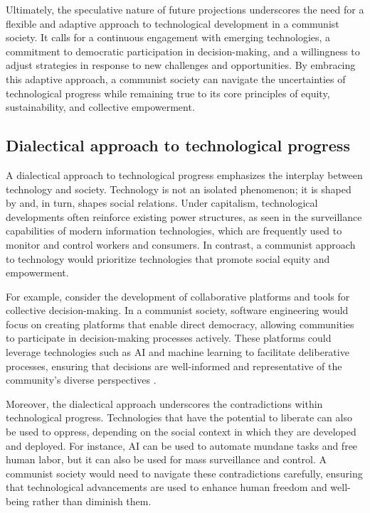 Ultimately, the speculative nature of future projections underscores the need for a flexible and adaptive approach to technological development in a communist society. It calls for a continuous engagement with emerging technologies, a commitment to democratic participation in decision-making, and a willingness to adjust strategies in response to new challenges and opportunities. By embracing this adaptive approach, a communist society can navigate the uncertainties of technological progress while remaining true to its core principles of equity, sustainability, and collective empowerment.

\subsection{Dialectical approach to technological progress}

A dialectical approach to technological progress emphasizes the interplay between technology and society. Technology is not an isolated phenomenon; it is shaped by and, in turn, shapes social relations. Under capitalism, technological developments often reinforce existing power structures, as seen in the surveillance capabilities of modern information technologies, which are frequently used to monitor and control workers and consumers. In contrast, a communist approach to technology would prioritize technologies that promote social equity and empowerment.

For example, consider the development of collaborative platforms and tools for collective decision-making. In a communist society, software engineering would focus on creating platforms that enable direct democracy, allowing communities to participate in decision-making processes actively. These platforms could leverage technologies such as AI and machine learning to facilitate deliberative processes, ensuring that decisions are well-informed and representative of the community's diverse perspectives \cite[pp.~233-237]{ParticipatoryTech2024}.

Moreover, the dialectical approach underscores the contradictions within technological progress. Technologies that have the potential to liberate can also be used to oppress, depending on the social context in which they are developed and deployed. For instance, AI can be used to automate mundane tasks and free human labor, but it can also be used for mass surveillance and control. A communist society would need to navigate these contradictions carefully, ensuring that technological advancements are used to enhance human freedom and well-being rather than diminish them.

